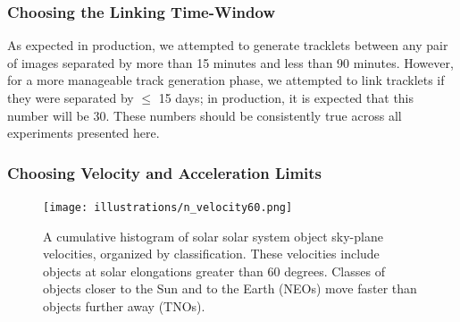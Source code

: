 \subsubsection{Choosing the Linking Time-Window}

As expected in production, we attempted to generate tracklets between
any pair of images separated by more than 15 minutes and less than
90 minutes.  However, for a more manageable track generation phase, we
attempted to link tracklets if they were separated by $\leq$ 15 days;
in production, it is expected that this number will be 30.  These
numbers should be consistently true across all experiments presented
here.


\subsubsection{Choosing Velocity and Acceleration Limits}
\label{velAccLimits}
\begin{figure}[ht!]
  \centering
  \texttt{[image: illustrations/n\_velocity60.png]}
  \caption[Velocity distribution of solar system objects.]{A cumulative histogram of solar solar system object
    sky-plane velocities, organized by classification.  These
    velocities include objects at solar elongations greater than 60 degrees. Classes of
    objects closer to the Sun and to the Earth (NEOs) move faster than
    objects further away (TNOs). }
  \label{velSurvey}
\end{figure}

